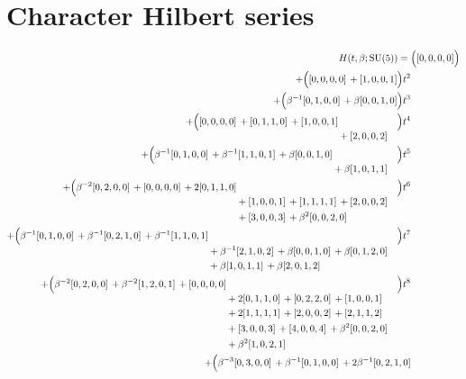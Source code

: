 \documentclass[10pt]{article}
\begin{document}
\section{Character Hilbert series}
\[
\begin{aligned}
H(t,\beta;\mathrm{SU}(5)) ={}&
   \Bigl([0,0,0,0]\Bigr) \\
  + \Bigl([0,0,0,0]\,+[1,0,0,1]\Bigr)t^{2} \\
  + \Bigl(\beta^{-1}[0,1,0,0]\,+\beta[0,0,1,0]\Bigr)t^{3} \\
  + \Bigl(\begin{aligned}[t][0,0,0,0]\,+[0,1,1,0]\,+[1,0,0,1] \\
  &{}+[2,0,0,2]\end{aligned}\Bigr)t^{4} \\
  + \Bigl(\begin{aligned}[t]\beta^{-1}[0,1,0,0]\,+\beta^{-1}[1,1,0,1]\,+\beta[0,0,1,0] \\
  &{}+\beta[1,0,1,1]\end{aligned}\Bigr)t^{5} \\
  + \Bigl(\begin{aligned}[t]\beta^{-2}[0,2,0,0]\,+[0,0,0,0]\,+2[0,1,1,0] \\
  &{}+[1,0,0,1]\,+[1,1,1,1]\,+[2,0,0,2] \\
  &{}+[3,0,0,3]\,+\beta^{2}[0,0,2,0]\end{aligned}\Bigr)t^{6} \\
  + \Bigl(\begin{aligned}[t]\beta^{-1}[0,1,0,0]\,+\beta^{-1}[0,2,1,0]\,+\beta^{-1}[1,1,0,1] \\
  &{}+\beta^{-1}[2,1,0,2]\,+\beta[0,0,1,0]\,+\beta[0,1,2,0] \\
  &{}+\beta[1,0,1,1]\,+\beta[2,0,1,2]\end{aligned}\Bigr)t^{7} \\
  + \Bigl(\begin{aligned}[t]\beta^{-2}[0,2,0,0]\,+\beta^{-2}[1,2,0,1]\,+[0,0,0,0] \\
  &{}+2[0,1,1,0]\,+[0,2,2,0]\,+[1,0,0,1] \\
  &{}+2[1,1,1,1]\,+[2,0,0,2]\,+[2,1,1,2] \\
  &{}+[3,0,0,3]\,+[4,0,0,4]\,+\beta^{2}[0,0,2,0] \\
  &{}+\beta^{2}[1,0,2,1]\end{aligned}\Bigr)t^{8} \\
  + \Bigl(\begin{aligned}[t]\beta^{-3}[0,3,0,0]\,+\beta^{-1}[0,1,0,0]\,+2\beta^{-1}[0,2,1,0] \\

\end{aligned}
\end{aligned}\]
\end{document}
